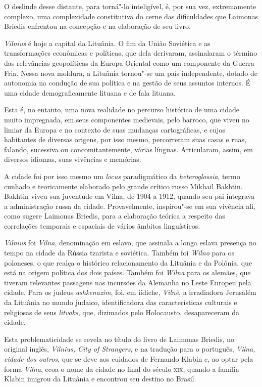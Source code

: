 O deslinde desse distante, para torná"-lo inteligível, é, por sua vez,
extremamente complexo, uma complexidade constitutiva do cerne das
dificuldades que Laimonas Briedis enfrentou na concepção e na elaboração
de seu livro.

\textit{\textit{Vilnius}} é hoje a capital da Lituânia. O fim da União Soviética e as
transformações econômicas e políticas, que dela derivaram, assinalaram o
término das relevâncias geopolíticas da Europa Oriental como um
componente da Guerra Fria. Nessa nova moldura, a Lituânia tornou"-se um
país independente, dotado de autonomia na condução de sua política e na
gestão de seus assuntos internos. É uma cidade demograficamente lituana
e de fala lituana.

Esta é, no entanto, uma nova realidade no percurso histórico de uma
cidade muito impregnada, em seus componentes medievais, pelo barroco,
que viveu no limiar da Europa e no contexto de suas mudanças
cartográficas, e cujos habitantes de diversas origens, por isso mesmo,
percorreram suas casas e ruas, falando, sucessiva ou concomitantemente,
várias línguas. Articularam, assim, em diversos idiomas, suas vivências
e memórias.

A cidade foi por isso mesmo um \textit{locus} paradigmático da
\textit{heteroglossia}, termo cunhado e teoricamente elaborado pelo grande
crítico russo Mikhail Bakhtin. Bakhtin viveu sua juventude em Vilna, de
1904 a 1912, quando seu pai integrava a administração russa da cidade.
Provavelmente, inspirou"-se em sua vivência ali, como sugere Laimonas
Briedis, para a elaboração teórica a respeito das correlações temporais
e espaciais de vários âmbitos linguísticos.

\textit{\textit{Vilnius}} foi \textit{Vilna}, denominação em eslavo, que assinala a longa
eslava presença no tempo na cidade da Rússia tzarista e soviética.
Também foi \textit{Wilno} para os poloneses, o que realça o histórico
relacionamento da Lituânia e da Polônia, que está na origem política dos
dois países. Também foi \textit{Wilna} para os alemães, que tiveram relevantes
passagens nas incursões da Alemanha no Leste Europeu pela cidade. Para
os judeus \textit{ashkenazim}, foi, em iídiche, \textit{Vilnè}, a irradiadora
Jerusalém da Lituânia no mundo judaico, identificadora das
características culturais e religiosas de seus \textit{litvaks}, que,
dizimados pelo Holocausto, desapareceram da cidade.

Esta problematicidade se revela no título do livro de Laimonas Briedis,
no original inglês, \textit{\textit{Vilnius}, City of Strangers}, e na tradução
para o português, \textit{Vilna, cidade dos outros}, que se deve aos
cuidados de Fernando Klabin e, ao optar pela forma \textit{Vilna}, ecoa o nome
da cidade no final do século \textsc{xix}, quando a família Klabin imigrou da
Lituânia e encontrou seu destino no Brasil.

